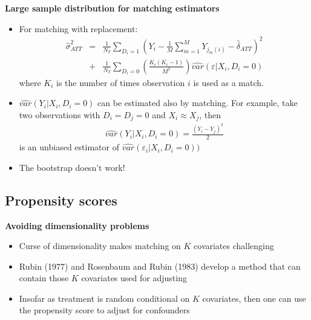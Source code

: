 \documentclass[notes=show]{beamer}
\begin{document}
\begin{frame}[plain]
	\begin{center}
	\textbf{Large sample distribution for matching estimators}
	\end{center}
	
	\begin{itemize}
	\item For matching with replacement:
		\begin{eqnarray*}
		\widehat{\sigma}^2_{ATT} &=& \frac{1}{N_T} \sum_{D_i=1} \left( Y_i - \frac{1}{M} \sum_{m=1}^M Y_{j_m(i)} - \widehat{\delta}_{ATT} \right)^2 \\
		&+& \frac{1}{N_T} \sum_{D_i=0} \left( \frac{K_i(K_i-1)}{M^2} \right) \widehat{var}(\varepsilon | X_i,D_i=0)
		\end{eqnarray*}where $K_i$ is the number of times observation $i$ is used as a match.
	\item $\widehat{var}(Y_i | X_i,D_i=0)$ can be estimated also by matching.  For example, take two observations with $D_i=D_j=0$ and $X_i \approx X_j$, then
		\begin{eqnarray*}
		\widehat{var}(Y_i | X_i,D_i=0) = \frac{(Y_i-Y_j)^2}{2}
		\end{eqnarray*}is an unbiased estimator of $\widehat{var}(\varepsilon_i | X_i,D_i=0))$
	\item The bootstrap doesn't work!
	\end{itemize}
\end{frame}
	

		  
\subsection{Propensity scores}

\begin{frame}
	\begin{center}
	\textbf{Avoiding dimensionality problems}
	\end{center}
	
	\begin{itemize}
	\item Curse of dimensionality makes matching on $K$ covariates challenging
	\item Rubin (1977) and Rosenbaum and Rubin (1983) develop a method that can contain those $K$ covariates used for adjusting
	\item Insofar as treatment is random conditional on $K$ covariates, then one can use the propensity score to adjust for confounders 
	\end{itemize}
	
\end{frame}
\end{document}
